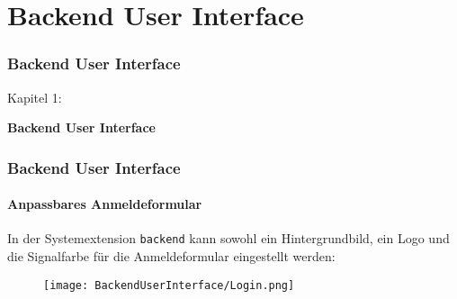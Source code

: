 %

\section{Backend User Interface}
\begin{frame}[fragile]
	\frametitle{Backend User Interface}

	\begin{center}\huge{Kapitel 1:}\end{center}
	\begin{center}\huge{\color{typo3darkgrey}\textbf{Backend User Interface}}\end{center}

\end{frame}

\begin{frame}[fragile]
	\frametitle{Backend User Interface}
	\framesubtitle{Anpassbares Anmeldeformular}

	In der Systemextension \texttt{backend} kann sowohl ein Hintergrundbild,
	ein Logo und die Signalfarbe für die Anmeldeformular eingestellt werden:

	\begin{figure}
		\texttt{[image: BackendUserInterface/Login.png]}
	\end{figure}

\end{frame}

